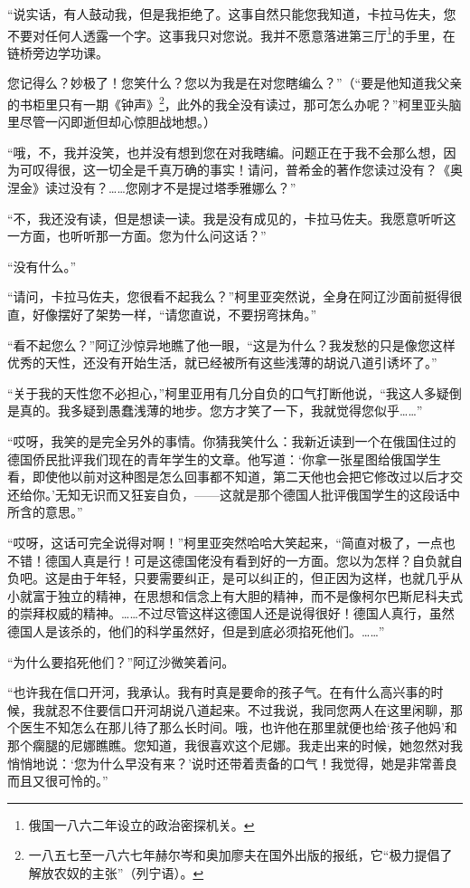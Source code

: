 \par “说实话，有人鼓动我，但是我拒绝了。这事自然只能您我知道，卡拉马佐夫，您不要对任何人透露一个字。这事我只对您说。我并不愿意落进第三厅\footnote{俄国一八六二年设立的政治密探机关。}的手里，在链桥旁边学功课。
\par 您记得么？妙极了！您笑什么？您以为我是在对您瞎编么？”（“要是他知道我父亲的书柜里只有一期《钟声》\footnote{一八五七至一八六七年赫尔岑和奥加廖夫在国外出版的报纸，它“极力提倡了解放农奴的主张”（列宁语）。}，此外的我全没有读过，那可怎么办呢？”柯里亚头脑里尽管一闪即逝但却心惊胆战地想。）
\par “哦，不，我并没笑，也并没有想到您在对我瞎编。问题正在于我不会那么想，因为可叹得很，这一切全是千真万确的事实！请问，普希金的著作您读过没有？《奥涅金》读过没有？……您刚才不是提过塔季雅娜么？”
\par “不，我还没有读，但是想读一读。我是没有成见的，卡拉马佐夫。我愿意听听这一方面，也听听那一方面。您为什么问这话？”
\par “没有什么。”
\par “请问，卡拉马佐夫，您很看不起我么？”柯里亚突然说，全身在阿辽沙面前挺得很直，好像摆好了架势一样，“请您直说，不要拐弯抹角。”
\par “看不起您么？”阿辽沙惊异地瞧了他一眼，“这是为什么？我发愁的只是像您这样优秀的天性，还没有开始生活，就已经被所有这些浅薄的胡说八道引诱坏了。”
\par “关于我的天性您不必担心，”柯里亚用有几分自负的口气打断他说，“我这人多疑倒是真的。我多疑到愚蠢浅薄的地步。您方才笑了一下，我就觉得您似乎……”
\par “哎呀，我笑的是完全另外的事情。你猜我笑什么：我新近读到一个在俄国住过的德国侨民批评我们现在的青年学生的文章。他写道：‘你拿一张星图给俄国学生看，即使他以前对这种图是怎么回事都不知道，第二天他也会把它修改过以后才交还给你。’无知无识而又狂妄自负，——这就是那个德国人批评俄国学生的这段话中所含的意思。”
\par “哎呀，这话可完全说得对啊！”柯里亚突然哈哈大笑起来，“简直对极了，一点也不错！德国人真是行！可是这德国佬没有看到好的一方面。您以为怎样？自负就自负吧。这是由于年轻，只要需要纠正，是可以纠正的，但正因为这样，也就几乎从小就富于独立的精神，在思想和信念上有大胆的精神，而不是像柯尔巴斯尼科夫式的崇拜权威的精神。……不过尽管这样这德国人还是说得很好！德国人真行，虽然德国人是该杀的，他们的科学虽然好，但是到底必须掐死他们。……”
\par “为什么要掐死他们？”阿辽沙微笑着问。
\par “也许我在信口开河，我承认。我有时真是要命的孩子气。在有什么高兴事的时候，我就忍不住要信口开河胡说八道起来。不过我说，我同您两人在这里闲聊，那个医生不知怎么在那儿待了那么长时间。哦，也许他在那里就便也给‘孩子他妈’和那个瘸腿的尼娜瞧瞧。您知道，我很喜欢这个尼娜。我走出来的时候，她忽然对我悄悄地说：‘您为什么早没有来？’说时还带着责备的口气！我觉得，她是非常善良而且又很可怜的。”
